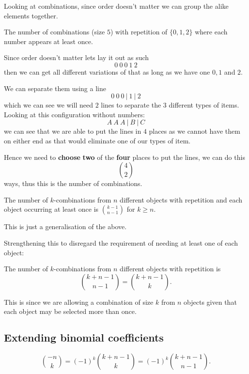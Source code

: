 \documentclass[10pt, a4paper]{article}
\begin{document}
Looking at combinations,
since order doesn't matter we can group the alike elements together.

\begin{example}
    The number of combinations
    (size $5$)
    with repetition of $\{0, 1, 2\}$ where each number appears at least once.

    Since order doesn't matter lets lay it out as such
    \[
    0\ 0\ 0\ 1\ 2
    \]
    then we can get all different variations of that as long as we have one $0, 1$ and $2$.

    We can separate them using a line
    \[
    0\ 0\ 0\ |\ 1\ |\ 2
    \]
    which we can see we will need $2$ lines to separate the $3$ different types of items.
    Looking at this configuration without numbers:
    \[
    A\ A\ A\ |\ B\ |\ C
    \]
    we can see that we are able to put the lines in $4$ places as we cannot have them on either end as that would eliminate one of our types of item.

    Hence we need to \textbf{choose} \textbf{two} of the \textbf{four} places to put the lines,
    we can do this
    \[
    \binom{4}{2}
    \]
    ways,
    thus this is the number of combinations.
\end{example}

\begin{theorem}
    The number of $k$-combinations from $n$ different objects with repetition and each object occurring at least once is $\binom{k - 1}{n - 1}$ for $k \geq n$.
\end{theorem}
This is just a generalisation of the above.

Strengthening this to disregard the requirement of needing at least one of each object:
\begin{theorem}
    The number of $k$-combinations from $n$ different objects with repetition is
    \[
    \binom{k + n - 1}{n - 1} = \binom{k + n - 1}{k}.
    \]
\end{theorem}
This is since we are allowing a combination of size $k$ from $n$ objects given that each object may be selected more than once.

\subsection{Extending binomial coefficients}
\begin{proposition}
    \[
    \binom{-n}{k} = (-1) ^ k\binom{k + n - 1}{k} = (-1) ^ k\binom{k + n - 1}{n - 1}.
    \]
\end{proposition}
\end{document}
